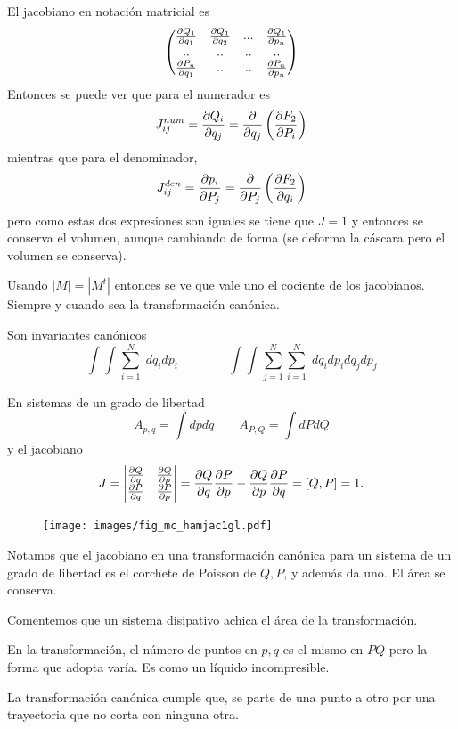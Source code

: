 \documentclass[10pt,oneside]{CBFT_book}
\begin{document}
El jacobiano en notación matricial es 
\[
	\begin{pmatrix}
	\dpar{Q_1}{q_1} & \dpar{Q_1}{q_2} & ... & \dpar{Q_1}{p_n} \\
	.. & .. & .. & .. \\
	\dpar{P_n}{q_1} & .. & .. & \dpar{P_n}{p_n}
	\end{pmatrix}
\]
Entonces se puede ver que para el numerador es
\[
	J_{ij}^{num} = \dpar{Q_i}{q_j} = \frac{\partial}{\partial q_j} \left(\dpar{F_2}{P_i} \right)
\]
mientras que para el denominador,
\[
	J_{ij}^{den} = \dpar{p_i}{P_j} = \frac{\partial}{\partial P_j} \left(\dpar{F_2}{q_i} \right)
\]
pero como estas dos expresiones son iguales se tiene que $J=1$ y entonces se conserva
el volumen, aunque cambiando de forma (se deforma la cáscara pero el volumen se conserva).

Usando $|M| = |M^t|$ entonces se ve que vale uno el cociente de los jacobianos. Siempre y cuando sea
la transformación canónica.

Son invariantes canónicos
\[
	\int\int \sum_{i=1}^N \; dq_i dp_i \qquad \qquad  \int\int \sum_{j=1}^N \sum_{i=1}^N \; dq_i dp_i dq_j dp_j
\]

En sistemas de un grado de libertad
\[
	A_{p,q} = \int dp dq \qquad A_{P,Q} = \int dP dQ
\]
y el jacobiano
\[
	J = \begin{vmatrix}
	     \dpar{Q}{q} & \dpar{Q}{p} \\
	     \dpar{P}{q} & \dpar{P}{p}
	    \end{vmatrix} =
	    \dpar{Q}{q} \dpar{P}{p} - \dpar{Q}{p} \dpar{P}{q} = [Q, P] = 1.
\]
\begin{figure}[!h]
	\begin{center}
	\texttt{[image: images/fig\_mc\_hamjac1gl.pdf]}	 
	\end{center}
	\caption{}
\end{figure} 

Notamos que el jacobiano en una transformación canónica para un sistema de un grado de libertad es el corchete de Poisson 
de $Q,P$, y además da uno. El área se conserva.

Comentemos que un sistema disipativo achica el área de la transformación.

En la transformación, el número de puntos en $p,q$  es el mismo en $PQ$ pero la forma que adopta varía. Es como un líquido
incompresible.

La transformación canónica cumple que, se parte de una punto a otro por una trayectoria que no corta con ninguna otra.
\end{document}
